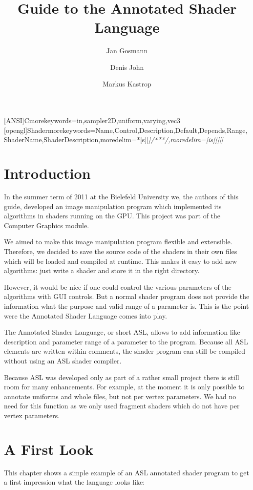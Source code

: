 \documentclass[11pt,a4paper]{scrreprt}
\title{Guide to the Annotated Shader Language}
\author{Jan Gosmann \and Denis John \and Markus Kastrop}
\begin{document}
[ANSI]{C}{morekeywords={in,sampler2D,uniform,varying,vec3}}
[opengl]{Shader}{morekeywords={Name,Control,Description,Default,Depends,Range,ShaderName,ShaderDescription},moredelim=*[s][\itshape]{/**}{*/},moredelim=[is][\itshape]{|}{|}}
\maketitle
\tableofcontents

\chapter{Introduction}
In the summer term of 2011 at the Bielefeld University we, the authors of this 
guide, developed an image manipulation program which implemented its algorithms 
in shaders running on the GPU. This project was part of the Computer Graphics 
module.

We aimed to make this image manipulation program flexible and extensible.  
Therefore, we decided to save the source code of the shaders in their own files 
which will be loaded and compiled at runtime. This makes it easy to add new 
algorithms: just write a shader and store it in the right directory.

However, it would be nice if one could control the various parameters of the 
algorithms with GUI controls. But a normal shader program does not provide the 
information what the purpose and valid range of a parameter is. This is the 
point were the Annotated Shader Language comes into play.

The Annotated Shader Language, or short ASL, allows to add information like 
description and parameter range of a parameter to the program. Because all ASL 
elements are written within comments, the shader program can still be compiled 
without using an ASL shader compiler.

Because ASL was developed only as part of a rather small project there is still 
room for many enhancements. For example, at the moment it is only possible to 
annotate uniforms and whole files, but not per vertex parameters. We had no need 
for this function as we only used fragment shaders which do not have per vertex 
parameters.


\chapter{A First Look}
This chapter shows a simple example of an ASL annotated shader program to get 
a first impression what the language looks like:
\end{document}
